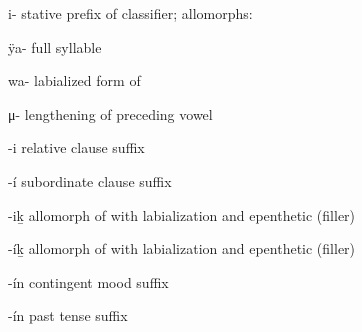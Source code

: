 \begin{morphdesc}[resume*=alphalist]
\item[i-]\label{m:i-stv}
	stative prefix of classifier;
	\newline
	allomorphs:
	\begin{allolist}
	\item[ÿa-]	full syllable
	\item[wa-]	labialized form of 
	\item[μ-]	lengthening of preceding vowel
	\end{allolist}

\item[-i]\label{m:-i-rel}
	relative clause suffix

\item[-í]\label{m:-í-sub}
	subordinate clause suffix

\item[-iḵ]\label{m:-iḵ}
	allomorph of  with labialization and epenthetic (filler) 

\item[-íḵ]\label{m:-íḵ}
	allomorph of  with labialization and epenthetic (filler) 

\item[-ín]\label{m:-ín-ctng}
	contingent mood suffix

\item[-ín]\label{m:-ín-past}
	past tense suffix
\end{morphdesc}

